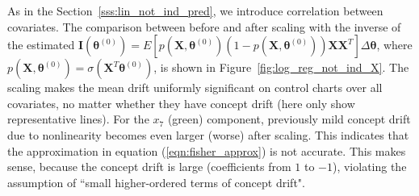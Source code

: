 \documentclass[twoside,11pt]{article}
\begin{document}
\begin{enumerate}[(I)]
As in the Section~\ref{sss:lin_not_ind_pred}, we introduce correlation between {covariates.} The comparison between before and after scaling with {the inverse of the estimated} {$\mathbf {I} ( {\bm{\theta}} ^{ (0)}) = E [{p} (\bm {X},\bm { \theta} ^{ (0)}) (1-{p}(\bm {X},\bm { \theta} ^{ (0)})) \bm {X} \bm {X}^T] \Delta \bm{ \theta}$}, where {$p (\bm {X},\bm { \theta} ^{ (0)}) = \sigma ( \bm {X}^T\bm { \theta} ^{ (0)})$}, is shown in Figure~\ref{fig:log_reg_not_ind_X}. The scaling makes the mean {drift} uniformly significant on control charts over all {covariates,} no matter whether they have concept drift (here only show representative lines). For the $x_7$ (green) component, previously mild concept drift due to nonlinearity becomes even larger (worse) after scaling. This indicates that the approximation in equation (\ref{eqn:fisher_approx}) is not accurate. This makes sense, because the concept drift is large (coefficients from $1$ to $-1$), violating the assumption of ``small higher-ordered terms of concept drift". 


\end{enumerate}
\end{document}
